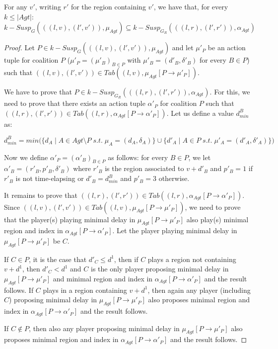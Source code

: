 \begin{lemma}
\label{lemma12}
For any $v'$, writing $r'$ for the region containing $v'$, we have that, for every $k \leq \vert Agt \vert$:
\[k-Susp_{G}(((l, v), (l', v')), \mu_{Agt}) \subseteq k-Susp_{G_{R}}(((l, r), (l', r')), \alpha_{Agt})\]
\end{lemma}

\begin{proof}
Let $P \in k-Susp_{G}(((l, v), (l', v')), \mu_{Agt})$ and let $\mu'_{P}$ be an action tuple for coalition $P$ ($\mu'_{P} = (\mu'_{B})_{B\in P}$ with $\mu'_{B} = (d'_{B}, \delta'_{B})$ for every $B \in P$) such that $((l, v), (l', v')) \in Tab((l, v), \mu_{Agt}[P \rightarrow \mu'_{P}])$.

We have to prove that $P \in k-Susp_{G_{R}}(((l, r), (l', r')), \alpha_{Agt})$. For this, we need to prove that there exists an action tuple $\alpha'_{P}$ for coalition $P$ such that $((l, r), (l', r')) \in Tab((l, r), \alpha_{Agt}[P \rightarrow \alpha'_{P}])$. Let us define a value $d^{B}_{min}$ as:

\[d^{B}_{min} = min\Big( \lbrace d_{A} \; \vert \; A \in Agt \setminus P \; s.t. \; \mu_{A} = (d_{A}, \delta_{A}) \rbrace \cup \lbrace d'_{A} \; \vert \; A \in P \; s.t. \; \mu'_{A} = (d'_{A}, \delta'_{A}) \rbrace\Big)\]

Now we define $\alpha'_{P} = (\alpha'_{B})_{B\in P}$ as follows: for every $B \in P$, we let $\alpha'_{B} = (r'_{B}, p'_{B}, \delta'_{B})$ where $r'_{B}$ is the region associated to $v + d'_{B}$ and $p'_{B} = 1$ if $r'_{B}$ is not time-elapsing or $d'_{B} = d^{B}_{min}$ and $p'_{B} = 3$ otherwise.

It remains to prove that $((l, r), (l', r')) \in Tab((l, r), \alpha_{Agt}[P \rightarrow \alpha'_{P}])$. Since $((l, v), (l', v')) \in Tab((l, v), \mu_{Agt}[P \rightarrow \mu'_{P}])$, we need to prove that the player(s) playing minimal delay in $\mu_{Agt}[P \rightarrow \mu'_{P}]$ also play(s) minimal region and index in $\alpha_{Agt}[P \rightarrow \alpha'_{P}]$. Let the player playing minimal delay in $\mu_{Agt}[P \rightarrow \mu'_{P}]$ be $C$.

If $C \in P$, it is the case that $d'_{C} \leq d^{1}$, then if $C$ plays a region not containing $v + d^{1}$, then $d'_{C} < d^{1}$ and $C$ is the only player proposing minimal delay in $\mu_{Agt}[P \rightarrow \mu'_{P}]$ and minimal region and index in $\alpha_{Agt}[P \rightarrow \alpha'_{P}]$ and the result follows. If $C$ plays in a region containing $v + d^{1}$, then again any player (including $C$) proposing minimal delay in $\mu_{Agt}[P \rightarrow \mu'_{P}]$ also proposes minimal region and index in $\alpha_{Agt}[P \rightarrow \alpha'_{P}]$ and the result follows.

If $C \notin P$, then also any player proposing minimal delay in $\mu_{Agt}[P \rightarrow \mu'_{P}]$ also proposes minimal region and index in $\alpha_{Agt}[P \rightarrow \alpha'_{P}]$ and the result follows.
\end{proof}

